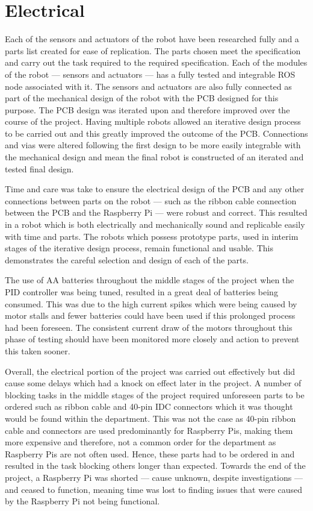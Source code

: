 \section{Electrical}\label{eval/elec}
Each of the sensors and actuators of the robot have been researched fully and a 
parts list created for ease of replication. The parts chosen meet the 
specification and carry out the task required to the required specification. 
Each of the modules of the robot --- sensors and actuators --- has a fully 
tested and integrable ROS node associated with it. The sensors and actuators are 
also fully connected as part of the mechanical design of the robot with the PCB 
designed for this purpose. The PCB design was iterated upon and therefore 
improved over the course of the project. Having multiple robots allowed an 
iterative design process to be carried out and this greatly improved the outcome 
of the PCB. Connections and vias were altered following the first design to be 
more easily integrable with the mechanical design and mean the final robot is 
constructed of an iterated and tested final design. 

Time and care was take to ensure the electrical design of the PCB and any other 
connections between parts on the robot --- such as the ribbon cable connection 
between the PCB and the Raspberry Pi --- were robust and correct. This resulted 
in a robot which is both electrically and mechanically sound and replicable 
easily with time and parts. The robots which possess prototype parts, used in 
interim stages of the iterative design process, remain functional and usable. 
This demonstrates the careful selection and design of each of the parts. 

The use of AA batteries throughout the middle stages of the project when the PID 
controller was being tuned, resulted in a great deal of batteries being consumed. 
This was due to the high current spikes which were being caused by motor stalls and 
fewer batteries could have been used if this prolonged process had been foreseen. The 
consistent current draw of the motors throughout this phase of testing should have 
been monitored more closely and action to prevent this taken sooner.   

Overall, the electrical portion of the project was carried out effectively but did 
cause some delays which had a knock on effect later in the project. A number of 
blocking tasks in the middle stages of the project required unforeseen parts to be 
ordered such as ribbon cable and 40-pin IDC connectors which it was thought would 
be found within the department. This was not the case as 40-pin ribbon cable and 
connectors are used predominantly for Raspberry Pis, making them more expensive 
and therefore, not a common order for the department as Raspberry Pis are not often 
used. Hence, these parts had to be ordered in and resulted in the task blocking 
others longer than expected. Towards the end of the project, a Raspberry Pi was 
shorted --- cause unknown, despite investigations --- and ceased to function, 
meaning time was lost to finding issues that were caused by the Raspberry Pi not 
being functional.    
 

